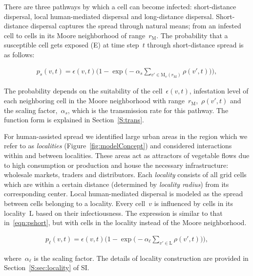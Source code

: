 \documentclass[11pt]{article}
\newcommand{\infest}{\rho}
\newcommand{\suitable}{\epsilon}
\newcommand{\pshort}{p_s}
\newcommand{\plocal}{p_{\ell}}
\newcommand{\asd}{\alpha_s}
\newcommand{\afm}{\alpha_{\ell}}
\newcommand{\locality}{\mathrm{L}}
\newcommand{\moore}{\mathrm{M}}
\newcommand{\mooreRange}{r_\mathrm{M}}
\theoremstyle{definition}
\begin{document}
There are three pathways by which a cell can become infected:
short-distance dispersal, local human-mediated dispersal and long-distance
dispersal. Short-distance dispersal captures the spread through natural
means; from an infested cell to cells in its Moore neighborhood of
range~$\mooreRange$.  The probability that a susceptible cell gets exposed
(E) at time step~$t$ through short-distance spread is as follows:
\begin{linenomath}
\begin{align}\label{eqn:pshort}
    \pshort(v,t)=\suitable(v,t)\bigg(1-
    \exp\Big(-\asd\sum_{v'\in\moore_v(\mooreRange)}\infest(v',t)\Big)\bigg),
\end{align}
\end{linenomath}
The probability depends on the suitability of the cell~$\suitable(v,t)$,
infestation level of each neighboring cell in the Moore neighborhood with
range~$\mooreRange$,~$\infest(v',t)$ and the scaling factor,~$\asd$, which
is the transmission rate for this pathway. The function form is explained
in Section~\ref{S:trans}.

For human-assisted spread we identified large urban areas in the region
which we refer to as {\it localities} (Figure~\ref{fig:modelConcept}) and
considered interactions within and between localities. These areas act as
attractors of vegetable flows due to high consumption or production and
house the necessary infrastructure: wholesale markets, traders and
distributors.  Each \emph{locality} consists of all grid cells which are
within a certain distance (determined by \emph{locality radius}) from its
corresponding center. Local human-mediated dispersal is modeled as the
spread between cells belonging to a locality.  Every cell~$v$ is influenced
by cells in its locality~$\locality$ based on their infectiousness.  The
expression is similar to that in~\eqref{eqn:pshort}, but with cells in the
locality instead of the Moore neighborhood.
\begin{linenomath}
\begin{align}\label{eqn:plocal}
    \plocal(v,t)=\suitable(v,t)\bigg(1-
    \exp\Big(-\afm\sum_{v'\in\locality}\infest(v',t)\Big)\bigg),
\end{align}
\end{linenomath}
where~$\afm$ is the scaling factor. The details of
locality construction are provided in Section~\ref{S:sec:locality} of SI.
\end{document}
